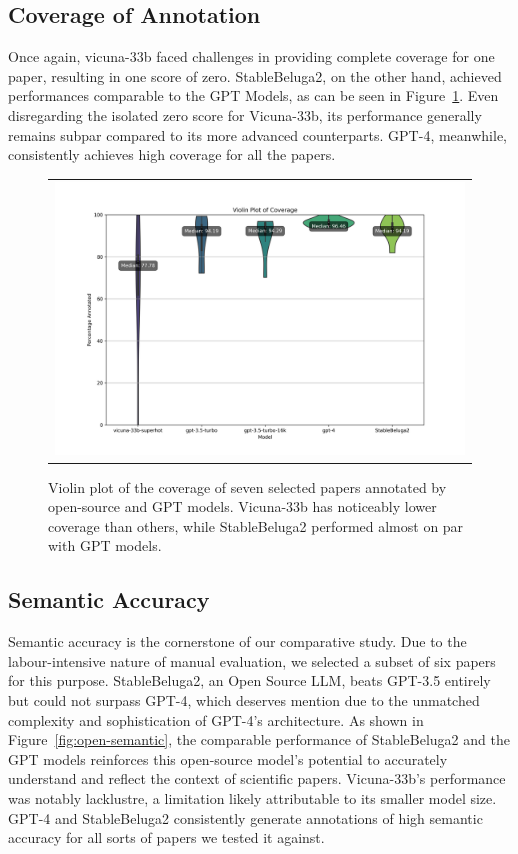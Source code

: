 \subsection{Coverage of Annotation}

Once again, vicuna-33b faced challenges in providing complete coverage for one paper, resulting in one score of zero. StableBeluga2, on the other hand, achieved performances comparable to the GPT Models, as can be seen in Figure~\ref{fig:open-coverage}. Even disregarding the isolated zero score for Vicuna-33b, its performance generally remains subpar compared to its more advanced counterparts. GPT-4, meanwhile, consistently achieves high coverage for all the papers.

\begin{figure}[ht]
  \centering
  \begin{tabular}{c}
  \includegraphics[width=14cm]{images/open-coverage.png}
  \end{tabular}
  \caption[Open Source Coverage]{Violin plot of the coverage of seven selected papers annotated by open-source and GPT models. Vicuna-33b has noticeably lower coverage than others, while StableBeluga2 performed almost on par with GPT models.}\label{fig:open-coverage}
\end{figure}

\subsection{Semantic Accuracy}

Semantic accuracy is the cornerstone of our comparative study. Due to the labour-intensive nature of manual evaluation, we selected a subset of six papers for this purpose. StableBeluga2, an Open Source LLM, beats GPT-3.5 entirely but could not surpass GPT-4, which deserves mention due to the unmatched complexity and sophistication of GPT-4's architecture. As shown in Figure~\ref{fig:open-semantic}, the comparable performance of StableBeluga2 and the GPT models reinforces this open-source model's potential to accurately understand and reflect the context of scientific papers. Vicuna-33b's performance was notably lacklustre, a limitation likely attributable to its smaller model size. GPT-4 and StableBeluga2 consistently generate annotations of high semantic accuracy for all sorts of papers we tested it against.


